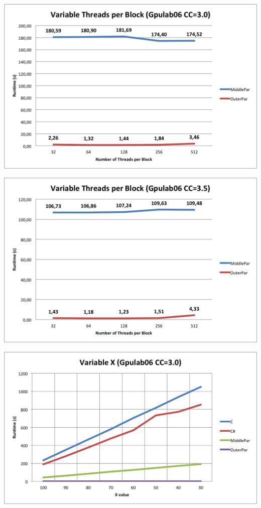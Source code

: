 \centerline{\includegraphics[width=\textwidth]{img/Gpulab-tpb30.png}}

\centerline{\includegraphics[width=\textwidth]{img/Gpulab-tpb35.png}}

\centerline{\includegraphics[width=\textwidth]{img/Gpulab-varx30.png}}

